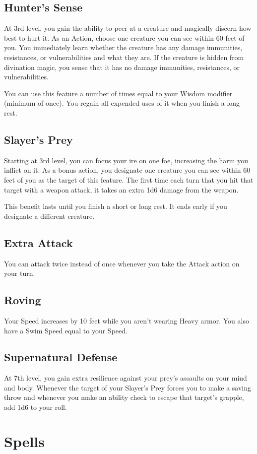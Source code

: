 \documentclass[letterpaper,openany,oneside,twocolumn]{book}
\begin{document}
\subsection*{Hunter's Sense}
At 3rd level, you gain the ability to peer at a creature and magically discern how best to hurt it. As an Action, choose one creature you can see within 60 feet of you. You immediately learn whether the creature has any damage immunities, resistances, or vulnerabilities and what they are. If the creature is hidden from divination magic, you sense that it has no damage immunities, resistances, or vulnerabilities.

You can use this feature a number of times equal to your Wisdom modifier (minimum of once). You regain all expended uses of it when you finish a long rest.
\subsection*{Slayer's Prey}
Starting at 3rd level, you can focus your ire on one foe, increasing the harm you inflict on it. As a bonus action, you designate one creature you can see within 60 feet of you as the target of this feature. The first time each turn that you hit that target with a weapon attack, it takes an extra 1d6 damage from the weapon.

This benefit lasts until you finish a short or long rest. It ends early if you designate a different creature.
\subsection*{Extra Attack}
You can attack twice instead of once whenever you take the Attack action on your turn.
\subsection*{Roving}
Your Speed increases by 10 feet while you aren't wearing Heavy armor. You also have a Swim Speed equal to your Speed.
\subsection*{Supernatural Defense}
At 7th level, you gain extra resilience against your prey's assaults on your mind and body. Whenever the target of your Slayer's Prey forces you to make a saving throw and whenever you make an ability check to escape that target's grapple, add 1d6 to your roll.

\section*{Spells}
\end{document}
